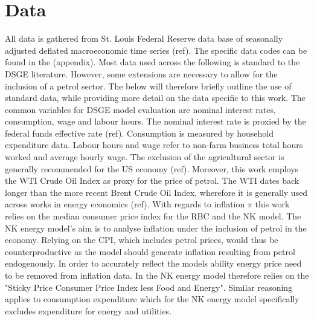 \documentclass[12pt,a4paper,english]{article} %
\let\oldsection\section
\renewcommand\section{\clearpage\oldsection}
\begin{document}
	

	
	\section{Data}
	
	All data is gathered from St. Louis Federal Reserve data base of seasonally adjusted deflated macroeconomic time series (ref). The specific data codes can be found in the (appendix). Most data used across the following is standard to the DSGE literature. However, some extensions are necessary to allow for the inclusion of a petrol sector. The below will therefore briefly outline the use of standard data, while providing more detail on the data specific to this work.
	The common variables for DSGE model evaluation are nominal interest rates, consumption, wage and labour hours. The nominal interest rate is proxied by the federal funds effective rate (ref). Consumption is measured by household expenditure data. Labour hours and wage refer to non-farm business total hours worked and average hourly wage. The exclusion of the agricultural sector is generally recommended for the US economy (ref). Moreover, this work employs the WTI Crude Oil Index as proxy for the price of petrol. The WTI dates back longer than the more recent Brent Crude Oil Index, wherefore it is generally used across works in energy economics (ref).
	With regards to inflation $\pi$ this work relies on the median consumer price index for the RBC and the NK model. The NK energy model's aim is to analyse inflation under the inclusion of petrol in the economy. Relying on the CPI, which includes petrol prices, would thus be counterproductive as the model should generate inflation resulting from petrol endogenously. In order to accurately reflect the models ability energy price need to be removed from inflation data. In the NK energy model therefore relies on the "Sticky Price Consumer Price Index less Food and Energy". Similar reasoning applies to consumption expenditure which for the NK energy model specifically excludes expenditure for energy and utilities.
	
\end{document}
